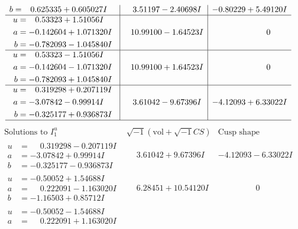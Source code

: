 \documentclass[1p]{elsarticle_modified}
\theoremstyle{definition}
\newcommand{\I}{\sqrt{-1}}
\begin{document}
$$\begin{array}{c|c|c}
\begin{aligned}
b &= \phantom{-}0.625335 + 0.605027 I\end{aligned}
 & \phantom{-}3.51197 - 2.40698 I & -0.80229 + 5.49120 I \\ \hline\begin{aligned}
u &= \phantom{-}0.53323 + 1.51056 I \\
a &= -0.142604 + 1.071320 I \\
b &= -0.782093 - 1.045840 I\end{aligned}
 & \phantom{-}10.99100 - 1.64523 I & \phantom{-0.000000 } 0 \\ \hline\begin{aligned}
u &= \phantom{-}0.53323 - 1.51056 I \\
a &= -0.142604 - 1.071320 I \\
b &= -0.782093 + 1.045840 I\end{aligned}
 & \phantom{-}10.99100 + 1.64523 I & \phantom{-0.000000 } 0 \\ \hline\begin{aligned}
u &= \phantom{-}0.319298 + 0.207119 I \\
a &= -3.07842 - 0.99914 I \\
b &= -0.325177 + 0.936873 I\end{aligned}
 & \phantom{-}3.61042 - 9.67396 I & -4.12093 + 6.33022 I\\
 \hline 
 \end{array}$$\newpage$$\begin{array}{c|c|c}  
\text{Solutions to }I^u_{1}& \I (\text{vol} + \sqrt{-1}CS) & \text{Cusp shape}\\
 \hline 
\begin{aligned}
u &= \phantom{-}0.319298 - 0.207119 I \\
a &= -3.07842 + 0.99914 I \\
b &= -0.325177 - 0.936873 I\end{aligned}
 & \phantom{-}3.61042 + 9.67396 I & -4.12093 - 6.33022 I \\ \hline\begin{aligned}
u &= -0.50052 + 1.54688 I \\
a &= \phantom{-}0.222091 - 1.163020 I \\
b &= -1.16503 + 0.85712 I\end{aligned}
 & \phantom{-}6.28451 + 10.54120 I & \phantom{-0.000000 } 0 \\ \hline\begin{aligned}
u &= -0.50052 - 1.54688 I \\
a &= \phantom{-}0.222091 + 1.163020 I \\

\end{aligned}
\end{array}$$
\end{document}
